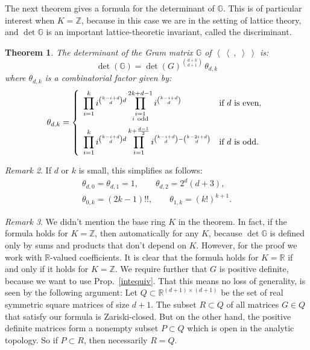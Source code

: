 \documentclass{amsart}
\newcommand{\bra}{\left<\!\!\!\:\left<}
\newcommand{\ket}{\right>\!\!\!\:\right>}
\newcommand{\G}{\mathbb{G}}
\newcommand{\R}{\mathbb{R}}
\newcommand{\Z}{\mathbb{Z}}
\theoremstyle{plain}
\newtheorem{theorem}{Theorem}[section]
\theoremstyle{definition}
\theoremstyle{remark}
\newtheorem{remark}[theorem]{Remark}
\begin{document}
The next theorem gives a formula for the determinant of $\G$. This is of particular interest when $K=\Z$, because in this case we are in the setting of lattice theory, and $\det \G$ is an important lattice-theoretic invariant, called the discriminant.
\begin{theorem} \label{maintheorem}
The determinant of the Gram matrix $\G$ of $\bra\ ,\;\ket$ is:
\begin{equation}
\det(\G)= \det(G)^{\binom{d+k}{d+1}}\,\theta_{d,k}
\end{equation}
where $\theta_{d,k}$ is a combinatorial factor given by:
\begin{equation} \label{thetaDef}
\theta_{d,k} = \left\{
 \begin{array}{*2{l}p{5cm}}
 \displaystyle\prod_{i=1}^k i^{\binom{k-i+d}{d}d}\prod_{\substack{i=1 \\ i\ \text{odd}\\\ }}^{2k+d-1}i^{\binom{k-i+d}{d}} &\text{if }d\text{ is even}, \\
 \displaystyle\prod_{i=1}^k i^{\binom{k-i+d}{d}d}\prod_{i=1}^{k+\frac{d-1}{2}} i^{\binom{k-i+d}{d} - \binom{k-2i+d}{d}} &\text{if }d\text{ is odd}.
\end{array}
\right.
\end{equation}
\end{theorem}
\begin{remark} If $d$ or $k$ is small, this simplifies as follows:
\begin{gather*}
\theta_{d,0}=\theta_{d,1} =1,\qquad \theta_{d,2} = 2^{d}(d+3), \\
\theta_{0,k} = (2k-1)!!, \qquad \theta_{1,k} = (k!)^{k+1}.
\end{gather*}
\end{remark}
\begin{remark}
We didn't mention the base ring $K$ in the theorem. In fact, if the formula holds for $K=\Z$, then automatically for any $K$, because $\det\G$ is defined only by sums and products that don't depend on $K$. However, for the proof we work with $\R$-valued coefficients. It is clear that the formula holds for $K=\R$ if and only if it holds for $K=\Z$. We require further that $G$ is positive definite, because we want to use Prop.~\ref{intequiv}. That this means no loss of generality, is seen by the following argument: Let $Q\subset \R^{(d+1)\times(d+1)}$ be the set of real symmetric square matrices of size $d+1$. The subset $R\subset Q$ of all matrices $G\in Q$ that satisfy our formula is Zariski-closed. But on the other hand, the positive definite matrices form a nonempty subset $P\subset Q$ which is open in the analytic topology. So if $P\subset R$, then necessarily $R=Q$.
\end{remark}
\end{document}
